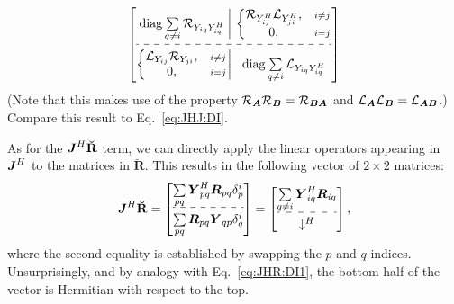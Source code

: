 \documentclass[useAMS,usenatbib]{mn2e}
\makeatletter
\newcommand{\mat}[1]{{\bmath{#1}}}
\newcommand{\JJ}{\mat{J}} %
\newcommand{\RR}{\mat{R}}
\newcommand{\Matrix}[2]{\left [ \begin{array}{@{}#1@{}}#2\end{array} \right ]}
\newcommand{\Stack}[1]{\begin{array}{@{}c@{}}#1\end{array}}
\newcommand{\AUGx}[1]{\mathbf{\breve{#1}}}
\newcommand{\RRr}{\AUGx{R}}
\newcommand{\Rop}[1]{\mathcal{R}_{{#1}}}
\newcommand{\Lop}[1]{\mathcal{L}_{{#1}}}
\numberwithin{equation}{section}
\providecommand{\DIFaddbegin}{} %
\providecommand{\DIFaddend}{} %
\providecommand{\DIFdelend}{} %
\makeatother
\begin{document}
\begin{equation}%
\DIFdelend \DIFaddbegin \JHJblocksFull{
  \mathrm{diag}\sum\limits_{q\ne i} \Rop{Y_{iq} Y^H_{iq}} 
}{
  \left \{ 
  \begin{array}{@{}cc@{}}
   \Rop{ Y^H_{ij}  } \Lop{Y^H_{ji}},&{\scriptstyle i\ne j} \\
   0, &{\scriptstyle i=j}
  \end{array} \right . 
}{
  \left \{ 
  \begin{array}{@{}cc@{}}
   \Lop{ Y_{ij}  } \Rop{ Y_{ji} },&{\scriptstyle i\ne j} \\
   0, &{\scriptstyle i=j}
  \end{array} \right . 
}{
  \mathrm{diag}\sum\limits_{q\ne i} \Lop{Y_{iq} Y^H_{iq}} 
}
\end{equation}
(Note that this makes use of the property $\Rop{\mat{A}}\Rop{\mat{B}}=\Rop{\mat{BA}}$ and 
$\Lop{\mat{A}}\Lop{\mat{B}}=\Lop{\mat{AB}}$.) Compare this result to Eq.~\ref{eq:JHJ:DI}.

As for the $\JJ^H\RRr$ term, we can directly apply the linear operators appearing in $\JJ^H$ 
to the matrices in $\RRr$. This results in the following vector of $2\times2$ matrices:
\begin{equation}
\JJ^H\RRr = \Matrix{c}{ 
\sum\limits_{pq} \YY^H_{pq} \RR_{pq} \delta^{i}_p  \\
\hdashline\\[-8pt]
\sum\limits_{pq} \RR_{pq} \YY_{qp} \delta^{i}_q 
} = \Matrix{c}{
\sum\limits_{q\ne i} \YY^H_{iq} \RR_{iq} \\
\hdashline\\[-8pt]
\downarrow^H
},
\DIFaddend \end{equation}
where the second equality is established by swapping the $p$ and $q$ indices. Unsurprisingly, and by analogy with 
Eq.~\ref{eq:JHR:DI1}, the bottom half of the vector is Hermitian with respect to the top.
\end{document}
